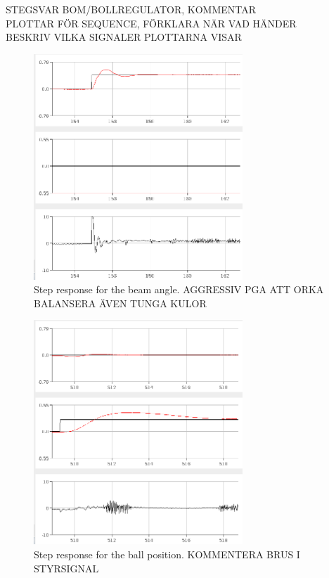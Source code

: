 STEGSVAR BOM/BOLLREGULATOR, KOMMENTAR \\
PLOTTAR FÖR SEQUENCE, FÖRKLARA NÄR VAD HÄNDER \\
BESKRIV VILKA SIGNALER PLOTTARNA VISAR \\

\begin{figure}
\centering
\includegraphics[width=0.7\textwidth]{figures/stepresponsebeam-crop.png}
\caption{Step response for the beam angle. AGGRESSIV PGA ATT ORKA BALANSERA ÄVEN TUNGA KULOR}
\label{fig:stepresponsebeam}
\end{figure}

\begin{figure}
\centering
\includegraphics[width=0.7\textwidth]{figures/stepresponseball1-crop.png}
\caption{Step response for the ball position. KOMMENTERA BRUS I STYRSIGNAL}
\label{fig:stepresponseball}
\end{figure}

